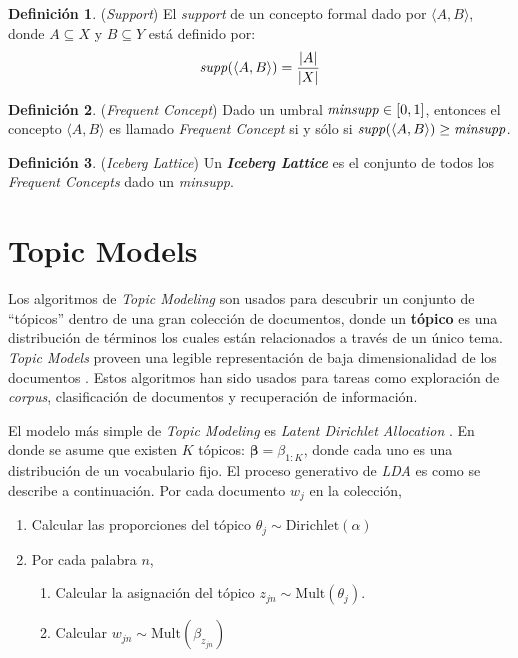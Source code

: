 \documentclass[12pt,oneside,letterpaper]{book}
\newcommand{\eng}[1]{\textit{#1}\xspace}			%
\theoremstyle{definition}
\newtheorem{definition}{Definición}[section]
\begin{document}
\newpage


 \begin{definition}{(\eng{Support})}
 El \eng{support} \cite{CodocedoTA11} de un concepto formal dado por $\langle A,B \rangle$, donde $A \subseteq X$ y $B \subseteq Y$ está definido por:
 \begin{equation*}
	\text{\emph{supp}}(\langle A,B \rangle) = \frac{|A|}{|X|}
\end{equation*}
 \end{definition}

 \begin{definition}{(\eng{Frequent Concept})}
 Dado un umbral $\text{\eng{minsupp}} \in [0,1]$, entonces el concepto $\langle A,B \rangle$ es llamado \eng{Frequent Concept} si y sólo si $\text{\emph{supp}}(\langle A,B \rangle) \ge \text{\emph{minsupp}}$.
 \end{definition}

 \begin{definition}{(\eng{Iceberg Lattice})}
 Un \textbf{\eng{Iceberg Lattice}} es el conjunto de todos los \eng{Frequent Concepts} dado un \eng{minsupp}.
 \end{definition}

\section{Topic Models}
\label{sec:topic_models}
Los algoritmos de \eng{Topic Modeling} \cite{TopicModels2009} son usados para descubrir un conjunto de ``{tópicos}'' dentro de una gran colección de documentos, donde un {\bf tópico} es una distribución de términos los cuales están relacionados a través de un único tema. \eng{Topic Models} proveen una legible representación de baja dimensionalidad de los documentos \cite{Chang2009}. Estos algoritmos han sido usados para tareas como exploración de \eng{corpus}, clasificación de documentos y recuperación de información.

El modelo más simple de \eng{Topic Modeling} es \eng{Latent Dirichlet Allocation} \cite{BleiLDA2003}. En donde se asume que existen $K$ tópicos: $\boldsymbol\beta = \beta_{1:K}$, donde cada uno es una distribución de un vocabulario fijo. El proceso generativo de \emph{LDA} es como se describe a continuación. Por cada documento $w_j$ en la colección,

\begin{enumerate}
	\item Calcular las proporciones del tópico $\theta_j \sim \text{Dirichlet}(\alpha)$
	\item Por cada palabra $n$,
	\begin{enumerate}
		\item Calcular la asignación del tópico $z_{jn} \sim \text{Mult}(\theta_j)$.
		\item Calcular $w_{jn} \sim \text{Mult}(\beta_{z_{jn}})$
	\end{enumerate}
\end{enumerate}
\end{document}
